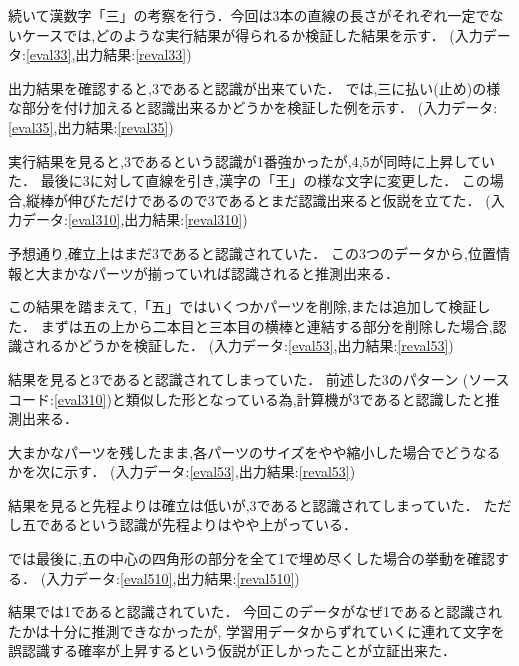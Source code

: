 続いて漢数字「三」の考察を行う．今回は3本の直線の長さがそれぞれ一定でないケースでは,どのような実行結果が得られるか検証した結果を示す．
(入力データ:\ref{eval33},出力結果:\ref{reval33})


出力結果を確認すると,3であると認識が出来ていた．
では,三に払い(止め)の様な部分を付け加えると認識出来るかどうかを検証した例を示す．
(入力データ:\ref{eval35},出力結果:\ref{reval35})

実行結果を見ると,3であるという認識が1番強かったが,4,5が同時に上昇していた．
最後に3に対して直線を引き,漢字の「王」の様な文字に変更した．
この場合,縦棒が伸びただけであるので3であるとまだ認識出来ると仮説を立てた．
(入力データ:\ref{eval310},出力結果:\ref{reval310})

予想通り,確立上はまだ3であると認識されていた．
この3つのデータから,位置情報と大まかなパーツが揃っていれば認識されると推測出来る．

この結果を踏まえて,「五」ではいくつかパーツを削除,または追加して検証した．
まずは五の上から二本目と三本目の横棒と連結する部分を削除した場合,認識されるかどうかを検証した．
(入力データ:\ref{eval53},出力結果:\ref{reval53})

結果を見ると3であると認識されてしまっていた．
前述した3のパターン (ソースコード:\ref{eval310})と類似した形となっている為,計算機が3であると認識したと推測出来る．

大まかなパーツを残したまま,各パーツのサイズをやや縮小した場合でどうなるかを次に示す．
(入力データ:\ref{eval53},出力結果:\ref{reval53})

結果を見ると先程よりは確立は低いが,3であると認識されてしまっていた．
ただし五であるという認識が先程よりはやや上がっている．

では最後に,五の中心の四角形の部分を全て1で埋め尽くした場合の挙動を確認する．
(入力データ:\ref{eval510},出力結果:\ref{reval510})

結果では1であると認識されていた．
今回このデータがなぜ1であると認識されたかは十分に推測できなかったが,
学習用データからずれていくに連れて文字を誤認識する確率が上昇するという仮説が正しかったことが立証出来た．

